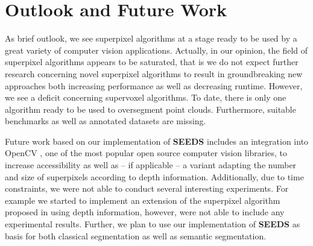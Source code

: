 \section{Outlook and Future Work}

As brief outlook, we see superpixel algorithms at a stage ready to be used by a great variety of computer vision applications. Actually, in our opinion, the field of superpixel algorithms appears to be saturated, that is we do not expect further research concerning novel superpixel algorithms to result in groundbreaking new approaches both increasing performance as well as decreasing runtime. However, we see a deficit concerning supervoxel algorithms. To date, there is only one algorithm ready to be used to oversegment point clouds. Furthermore, suitable benchmarks as well as annotated datasets are missing.

Future work based on our implementation of \textbf{SEEDS} includes an integration into OpenCV \cite{Bradski:2000}, one of the most popular open source computer vision libraries, to increase accessibility as well as -- if applicable -- a variant adapting the number and size of superpixels according to depth information. Additionally, due to time constraints, we were not able to conduct several interesting experiments. For example we started to implement an extension of the superpixel algorithm proposed in \cite{ConradMertzMester:2013} using depth information, however, were not able to include any experimental results. Further, we plan to use our implementation of \textbf{SEEDS} as basis for both classical segmentation as well as semantic segmentation.
